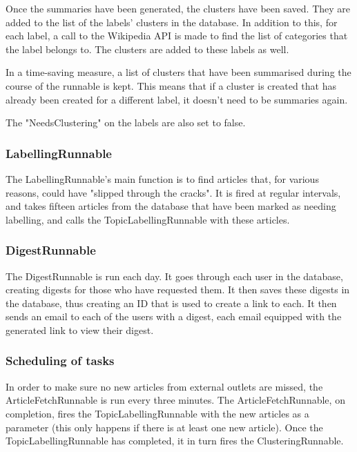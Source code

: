 \documentclass[12pt]{article}
\begin{document}
Once the summaries have been generated, the clusters have been saved. They are added to the list of the labels' clusters in the database. In addition to this, for each label, a call to the Wikipedia API is made to find the list of categories that the label belongs to. The clusters are added to these labels as well.

In a time-saving measure, a list of clusters that have been summarised during the course of the runnable is kept. This means that if a cluster is created that has already been created for a different label, it doesn't need to be summaries again.

The "NeedsClustering" on the labels are also set to false.

\subsubsection{LabellingRunnable}

The LabellingRunnable's main function is to find articles that, for various reasons, could have "slipped through the cracks". It is fired at regular intervals, and takes fifteen articles from the database that have been marked as needing labelling, and calls the TopicLabellingRunnable with these articles.

\subsubsection{DigestRunnable}

The DigestRunnable is run each day. It goes through each user in the database, creating digests for those who have requested them. It then saves these digests in the database, thus creating an ID that is used to create a link to each. It then sends an email to each of the users with a digest, each email equipped with the generated link to view their digest.

\subsubsection{Scheduling of tasks}

In order to make sure no new articles from external outlets are missed, the ArticleFetchRunnable is run every three minutes. The ArticleFetchRunnable, on completion, fires the TopicLabellingRunnable with the new articles as a parameter (this only happens if there is at least one new article). Once the TopicLabellingRunnable has completed, it in turn fires the ClusteringRunnable. 
\end{document}
